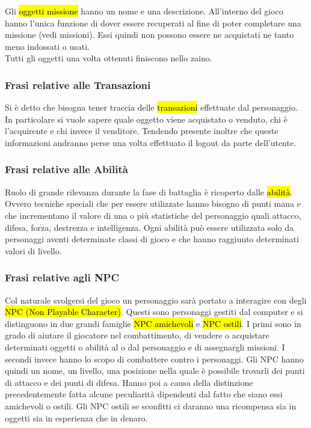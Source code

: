Gli \hl{oggetti missione} hanno un nome e una descrizione. All'interno del gioco hanno l'unica funzione di dover essere recuperati al fine di poter completare una missione (vedi missioni). Essi quindi non possono essere ne acquistati ne tanto meno indossati o usati.\\
Tutti gli oggetti una volta ottenuti finiscono nello zaino.\\


\subsubsection{Frasi relative alle Transazioni}

Si è detto che bisogna tener traccia delle \hl{transazioni} effettuate  dal personaggio. In particolare si vuole sapere quale oggetto viene acquistato o venduto, chi è l'acquirente e chi invece il venditore.
Tendendo presente inoltre che queste informazioni andranno perse una volta effettuato il logout da parte dell'utente.

\subsubsection{Frasi relative alle Abilità}

Ruolo di grande rilevanza durante la fase di battaglia è ricoperto dalle \hl{abilità}.
Ovvero tecniche speciali che per essere utilizzate hanno bisogno di punti mana e che  incrementano il valore di una o pi\`{u} statistiche del personaggio quali attacco, difesa, forza, destrezza e intelligenza. Ogni abilit\`{a} pu\`{o} essere utilizzata solo da personaggi aventi determinate classi di gioco e che hanno raggiunto determinati valori di livello.
\\
\subsubsection{Frasi relative agli NPC}

Col naturale svolgersi  del gioco un personaggio  sarà portato a interagire con degli \hl{NPC (Non Playable Character)}. Questi sono personaggi gestiti dal computer e si distinguono in due grandi famiglie \hl{NPC amichevoli} e \hl{NPC ostili}. I primi sono in grado di aiutare il giocatore nel combattimento, di vendere o acquistare determinati oggetti o abilità al o dal personaggio e di assegnargli missioni. I secondi invece hanno lo scopo di combattere contro i personaggi.
Gli NPC hanno quindi un nome, un livello, una posizione nella quale è possibile trovarli dei punti di attacco e dei punti di difesa. Hanno poi a causa della distinzione precedentemente fatta alcune peculiarità dipendenti dal fatto che  siano essi amichevoli o ostili. Gli NPC ostili se sconfitti ci daranno una ricompensa sia in oggetti sia in esperienza che in  denaro.\\


